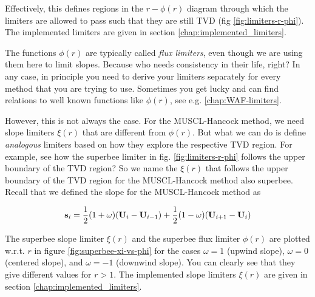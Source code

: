 Effectively, this defines regions in the $r-\phi(r)$ diagram through which the limiters are allowed to pass such that they are still TVD (fig \ref{fig:limiters-r-phi}).
The implemented limiters are given in section \ref{chap:implemented_limiters}.

The functions $\phi(r)$ are typically called \emph{flux limiters}, even though we are using them here to limit slopes.
Because who needs consistency in their life, right?
In any case, in principle you need to derive your limiters separately for every method that you are trying to use.
Sometimes you get lucky and can find relations to well known functions like $\phi(r)$, see e.g. \ref{chap:WAF-limiters}.

However, this is not always the case.
For the MUSCL-Hancock method, we need slope limiters $\xi(r)$ that are different from $\phi(r)$.
But what we can do is define \emph{analogous} limiters based on how they explore the respective TVD region.
For example, see how the superbee limiter in fig. \ref{fig:limiters-r-phi} follows the upper boundary of the TVD region?
So we name the $\xi(r)$ that follows the upper boundary of the TVD region for the MUSCL-Hancock method also superbee.
Recall that we defined the slope for the MUSCL-Hancock method as 

\begin{equation}
	\mathbf{s}_i = \frac{1}{2}(1 + \omega) (\mathbf{U}_{i} - \mathbf{U}_{i-1}) + \frac{1}{2} (1 - \omega) (\mathbf{U}_{i+1} - \mathbf{U}_{i})
\end{equation}

The superbee slope limiter $\xi(r)$ and the superbee flux limiter $\phi(r)$ are plotted w.r.t. $r$ in figure \ref{fig:superbee-xi-vs-phi} for the cases $\omega = 1$ (upwind slope), $\omega = 0$ (centered slope), and $\omega = -1$ (downwind slope).
You can clearly see that they give different values for $r > 1$.
The implemented slope limiters $\xi(r)$ are given in section \ref{chap:implemented_limiters}.




